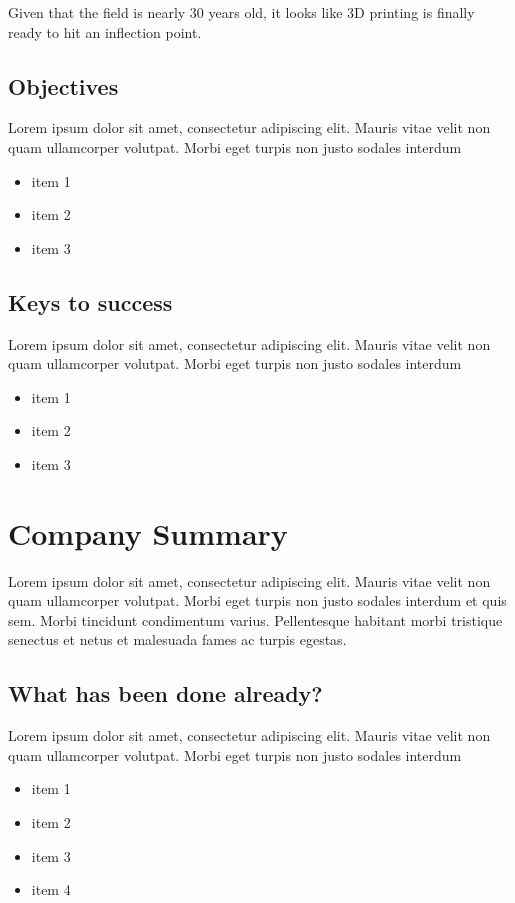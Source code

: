 \documentclass[11pt,a4paper,titlepage]{article}
\begin{document}
Given that the field is nearly 30 years old, it looks like 3D printing is finally ready to hit an inflection point.
\subsection{Objectives}
Lorem ipsum dolor sit amet, consectetur adipiscing elit. Mauris vitae velit 
non quam ullamcorper volutpat. Morbi eget turpis non justo sodales interdum
\newline
\begin{itemize}
\item item 1
\item item 2
\item item 3
\end{itemize}

\subsection{Keys to success}
Lorem ipsum dolor sit amet, consectetur adipiscing elit. Mauris vitae velit 
non quam ullamcorper volutpat. Morbi eget turpis non justo sodales interdum
\newline
\begin{itemize}
\item item 1
\item item 2
\item item 3
\end{itemize}

\section{Company Summary}
Lorem ipsum dolor sit amet, consectetur adipiscing elit. Mauris vitae velit 
non quam ullamcorper volutpat. Morbi eget turpis non justo sodales interdum 
et quis sem. Morbi tincidunt condimentum varius. Pellentesque habitant morbi 
tristique senectus et netus et malesuada fames ac turpis egestas.\newline

\subsection{What has been done already?}
Lorem ipsum dolor sit amet, consectetur adipiscing elit. Mauris vitae velit 
non quam ullamcorper volutpat. Morbi eget turpis non justo sodales interdum
\newline
\begin{itemize}
\item item 1
\item item 2
\item item 3
\item item 4
\end{itemize}
\end{document}
